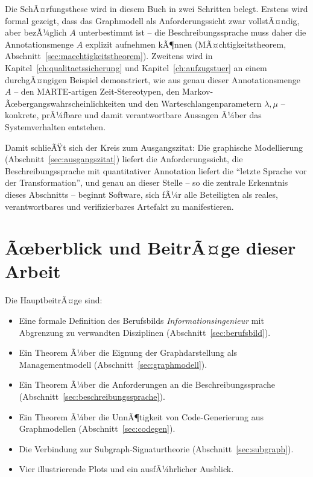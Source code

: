 ﻿\documentclass[a4paper,12pt]{report}
\theoremstyle{definition}
\begin{document}
\noindent
Die SchÃ¤rfungsthese wird in diesem Buch in zwei Schritten belegt. Erstens wird
formal gezeigt, dass das Graphmodell als Anforderungssicht zwar vollstÃ¤ndig, aber
bezÃ¼glich $A$ unterbestimmt ist -- die Beschreibungssprache muss daher die
Annotationsmenge $A$ explizit aufnehmen kÃ¶nnen (MÃ¤chtigkeitstheorem,
Abschnitt~\ref{sec:maechtigkeitstheorem}). Zweitens wird in
Kapitel~\ref{ch:qualitaetssicherung} und Kapitel~\ref{ch:aufzugstuer} an einem
durchgÃ¤ngigen Beispiel demonstriert, wie aus genau dieser Annotationsmenge $A$ -- den
MARTE-artigen Zeit-Stereotypen, den Markov-Ãœbergangswahrscheinlichkeiten und den
Warteschlangenparametern $\lambda, \mu$ -- konkrete, prÃ¼fbare und damit
verantwortbare Aussagen Ã¼ber das Systemverhalten entstehen.

\noindent
Damit schlieÃŸt sich der Kreis zum Ausgangszitat: Die graphische Modellierung
(Abschnitt~\ref{sec:ausgangszitat}) liefert die Anforderungssicht, die
Beschreibungssprache mit quantitativer Annotation liefert die ``letzte Sprache vor
der Transformation'', und genau an dieser Stelle -- so die zentrale Erkenntnis dieses
Abschnitts -- beginnt Software, sich fÃ¼r alle Beteiligten als reales,
verantwortbares und verifizierbares Artefakt zu manifestieren.

\section{Ãœberblick und BeitrÃ¤ge dieser Arbeit}

Die HauptbeitrÃ¤ge sind:

\begin{itemize}
  \item Eine formale Definition des Berufsbilds \emph{Informationsingenieur} mit
        Abgrenzung zu verwandten Disziplinen (Abschnitt~\ref{sec:berufsbild}).
  \item Ein Theorem Ã¼ber die Eignung der Graphdarstellung als Managementmodell
        (Abschnitt~\ref{sec:graphmodell}).
  \item Ein Theorem Ã¼ber die Anforderungen an die Beschreibungssprache
        (Abschnitt~\ref{sec:beschreibungssprache}).
  \item Ein Theorem Ã¼ber die UnnÃ¶tigkeit von Code-Generierung aus Graphmodellen
        (Abschnitt~\ref{sec:codegen}).
  \item Die Verbindung zur Subgraph-Signaturtheorie
        (Abschnitt~\ref{sec:subgraph}).
  \item Vier illustrierende Plots und ein ausfÃ¼hrlicher Ausblick.
\end{itemize}
\end{document}
